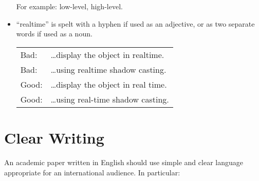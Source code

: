 \begin{itemize}
For example: low-level, high-level.



\item ``realtime'' is spelt with a hyphen if used as
  an adjective, or as two separate words if used as a noun.

\begin{tabular}{lp{0.9\hsize}}
Bad:  & \ldots display the object in realtime.  \\
Bad:  & \ldots using realtime shadow casting.   \\
Good: & \ldots display the object in real time. \\
Good: & \ldots using real-time shadow casting.  \\
\end{tabular}


\end{itemize}









\section{Clear Writing}
\label{sec:Clear}

An academic paper written in English should use simple and clear
language appropriate for an international audience. In particular:

